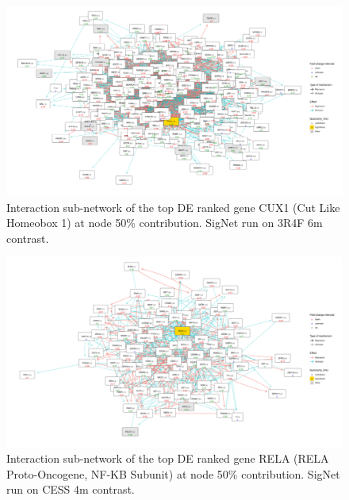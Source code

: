 \begin{figure}[!htbp]
    \centering
    \includegraphics[width=\textwidth, height=\textheight, keepaspectratio]{Major Thesis/figures/iut/graph/3R4F46m50-CUX1.png}
    \caption{Interaction sub-network of the top DE ranked gene CUX1 (Cut Like Homeobox 1) at node 50\% contribution. SigNet run on 3R4F 6m contrast.}
\end{figure}


\begin{figure}[!htbp]
    \centering
    \includegraphics[width=\textwidth, height=\textheight, keepaspectratio]{Major Thesis/figures/iut/graph/CESS4m50-RELA.png}
    \caption{Interaction sub-network of the top DE ranked gene RELA (RELA Proto-Oncogene, NF-KB Subunit) at node 50\% contribution. SigNet run on CESS 4m contrast.}
\end{figure}

